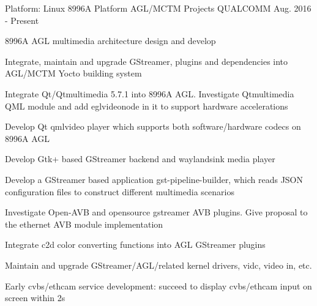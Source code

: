 
\begin{cventries}

  \cventry
    {Platform: Linux} %
    {8996A Platform AGL/MCTM Projects} %
    {QUALCOMM} %
    {Aug. 2016 - Present} %
    {
      \begin{cvitems} %
        \item {8996A AGL multimedia architecture design and develop}
        \item {Integrate, maintain and upgrade GStreamer, plugins and dependencies into AGL/MCTM Yocto building system}
        \item {Integrate Qt/Qtmultimedia 5.7.1 into 8996A AGL. Investigate Qtmultimedia QML module and add eglvideonode in it to support hardware accelerations}
        \item {Develop Qt qmlvideo player which supports both software/hardware codecs on 8996A AGL}
        \item {Develop Gtk+ based GStreamer backend and waylandsink media player}
        \item {Develop a GStreamer based application gst-pipeline-builder, which reads JSON configuration files to  construct different multimedia scenarios}
        \item {Investigate Open-AVB and opensource gstreamer AVB plugins. Give proposal to the ethernet AVB module implementation}
        \item {Integrate c2d color converting functions into AGL GStreamer plugins}
        \item {Maintain and upgrade GStreamer/AGL/related kernel drivers, vidc, video in, etc.}
        \item {Early cvbs/ethcam service development: succeed to display cvbs/ethcam input on screen within 2s}
      \end{cvitems}
    }


\end{cventries}
